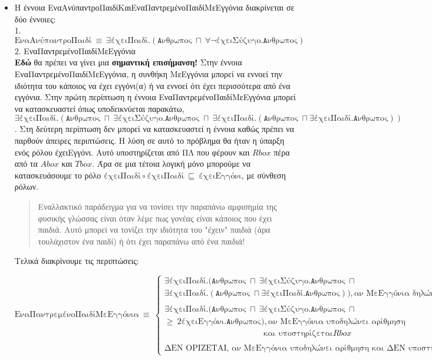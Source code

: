 \documentclass[10pt]{article}
\newcommand{\human}{\texttt{Aνθρωπος}}
\newcommand{\hasChild}{\texttt{έχειΠαιδί}}
\newcommand{\hasGChild}{\texttt{έχειΕγγόνι}}
\newcommand{\isMarried}{\texttt{έχειΣύζυγο}}
\begin{document}
\begin{itemize}
\begin{itemize}
\item Η έννοια ΕναΑνύπαντροΠαιδίΚαιΕναΠαντρεμένοΠαιδίΜεΕγγόνια διακρίνεται σε δύο έννοιες:\\
1. $\texttt{ΕναΑνύπαντροΠαιδί} \ \equiv \ \exists \hasChild.(\human \ \sqcap \ \forall\neg \isMarried.\human)$
\\
2. ΕναΠαντρεμένοΠαιδίΜεΕγγόνια
\\
\textbf{Εδώ} θα πρέπει να γίνει μια \textbf{σημαντική επισήμανση!} Στην έννοια ΕναΠαντρεμένοΠαιδίΜεΕγγόνια, η συνθήκη ΜεΕγγόνια μπορεί να εννοεί την ιδιότητα του κάποιος να έχει εγγόνι(α) ή να εννοεί ότι έχει περισσότερα από ένα εγγόνια. Στην πρώτη περίπτωση η έννοια ΕναΠαντρεμένοΠαιδίΜεΕγγόνια μπορεί να κατασκευαστεί όπως υποδεικνύεται παρακάτω,$\exists\hasChild.(\human \ \sqcap \ \exists\isMarried.\human \ \sqcap \ \exists\hasChild.(\human \ \sqcap \exists\hasChild.\human))$. Στη δεύτερη περίπτωση δεν μπορεί να κατασκευαστεί η έννοια καθώς πρέπει να παρθούν άπειρες περιπτώσεις. Η λύση σε αυτό το πρόβλημα θα ήταν η ύπαρξη ενός ρόλου έχειΕγγόνι. Αυτό υποστηρίζεται από ΠΛ που φέρουν και $Rbox$ πέρα από τα $Abox$ και $Tbox$. Άρα σε μια τέτοια λογική μόνο μπορούμε να κατασκευάσουμε το ρόλο $\hasChild \circ \hasChild \ \sqsubseteq \ \hasGChild$, με σύνθεση ρόλων.
\begin{quote}
\small{Εναλλακτικό παράδειγμα για να τονίσει την παραπάνω αμφισημία της φυσικής γλώσσας είναι όταν λέμε πως γονέας είναι κάποιος που έχει παιδιά. Αυτό μπορεί να τονίζει την ιδιότητα του "έχειν" παιδιά (άρα τουλάχιστον ένα παιδί) ή ότι έχει παραπάνω από ένα παιδιά!}
\end{quote}

Τελικά διακρίνουμε τις περιπτώσεις:

$
\texttt{ΕναΠαντρεμένοΠαιδίΜεΕγγόνια} \ \equiv \ 
\begin{cases}
\exists\hasChild.(\human \ \sqcap \ \exists\isMarried.\human \ \sqcap \\ \exists\hasChild.(\human \ \sqcap \exists\hasChild.\human)), \texttt{αν ΜεΕγγόνια δηλώνει ιδιότητα}
\\\\
\exists\hasChild.(\human \ \sqcap \ \exists\isMarried.\human \ \sqcap \\ \geq \ 2 \hasGChild.\human), \texttt{αν ΜεΕγγόνια υποδηλώνει αρίθμηση} \\ \qquad\qquad\qquad\qquad\qquad\qquad \texttt{και υποστηρίζεται} Rbox
\\\\
\texttt{ΔΕΝ ΟΡΙΖΕΤΑΙ, αν ΜεΕγγόνια υποδηλώνει αρίθμηση και ΔΕΝ υποστηρίζεται} Rbox
\end{cases}
$



\end{itemize}
\end{itemize}
\end{document}

